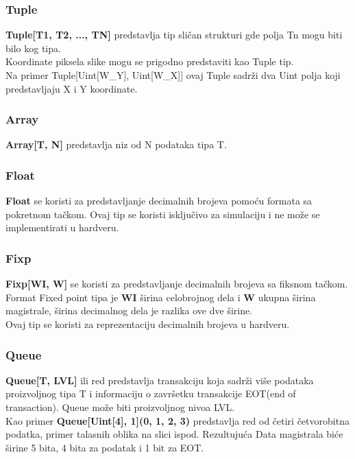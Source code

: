 \subsubsection{Tuple} \label{tuple_sec}
\textbf{Tuple[T1, T2, ..., TN]} predstavlja tip sličan strukturi gde
  polja Tn mogu biti bilo kog tipa. \\
  Koordinate piksela slike mogu se prigodno predstaviti kao Tuple tip. \\
  Na primer Tuple[Uint[W\_Y], Uint[W\_X]] ovaj Tuple sadrži dva Uint polja koji
  predstavljaju X i Y koordinate.

\subsubsection{Array} \label{array_sec}
\textbf{Array[T, N]} predstavlja niz od N podataka tipa T.

\subsubsection{Float}
\textbf{Float} se koristi za predstavljanje decimalnih brojeva pomoću formata
sa pokretnom tačkom.
Ovaj tip se koristi isključivo za simulaciju i ne može se implementirati u hardveru.

\subsubsection{Fixp}
\textbf{Fixp[WI, W]} se koristi za predstavljanje decimalnih brojeva sa fiksnom tačkom. \\
Format Fixed point tipa je \textbf{WI} širina celobrojnog dela i \textbf{W}
ukupna širina magistrale, širina decimalnog dela je razlika ove dve širine. \\
Ovaj tip se koristi za reprezentaciju decimalnih brojeva u hardveru.

\subsubsection{Queue} \label{queue_sec}
\textbf{Queue[T, LVL]} ili red predstavlja transakciju koja sadrži više
podataka proizvoljnog tipa T i informaciju o završetku transakcije EOT(end of
transaction).
Queue može biti proizvoljnog nivoa LVL. \\
Kao primer \textbf{Queue[Uint[4], 1](0, 1, 2, 3)} predstavlja red od četiri
četvorobitna podatka, primer talasnih oblika na slici ispod.
Rezultujuća Data magistrala biće širine 5 bita, 4 bita za podatak i 1 bit za EOT.

